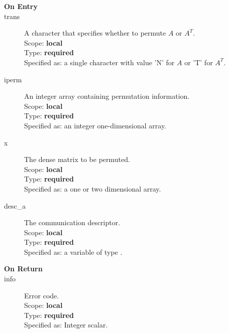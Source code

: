 \begin{description}
\item[\bf On Entry]
\item[trans] A character that specifies whether to permute $A$  or $A^T$.\\
Scope: {\bf local} \\
Type: {\bf required}\\
Specified as: a single character with value 'N' for $A$ or 'T' for $A^T$.\\
\item[iperm] An integer array containing permutation information.\\
Scope: {\bf local} \\
Type: {\bf required}\\
Specified as: an integer one-dimensional array.\\
\item[x] The dense matrix to be permuted.\\
Scope: {\bf local} \\
Type: {\bf required}\\
Specified as: a one or two dimensional array.\\
\item[desc\_a] The communication descriptor.\\
Scope: {\bf local} \\
Type: {\bf required}\\
Specified as: a variable of type \descdata.\\
\end{description}

\begin{description}
\item[\bf On Return]
\item[info] Error code.\\
Scope: {\bf local} \\
Type: {\bf required}\\
Specified as: Integer scalar.\\
\end{description}

%
%


